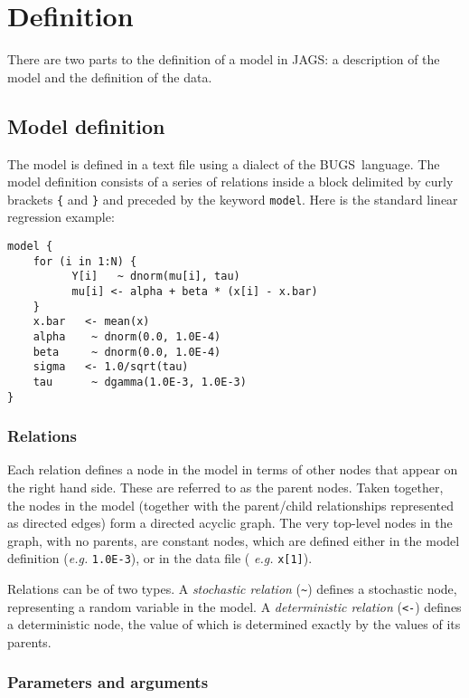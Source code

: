\documentclass[11pt, a4paper, titlepage]{report}
\newcommand{\JAGS}{\textsf{JAGS}}
\newcommand{\BUGS}{\textsf{BUGS}}
\begin{document}
\section{Definition}

There are two parts to the definition of a model in \JAGS: a
description of the model and the definition of the data.

\subsection{Model definition}

The model is defined in a text file using a dialect of the
\BUGS\ language.  The model definition consists of a series of
relations inside a block delimited by curly brackets \verb+{+ and
\verb+}+ and preceded by the keyword \verb+model+. Here is the standard
linear regression example:

\begin{verbatim}
model {
    for (i in 1:N) {
          Y[i]   ~ dnorm(mu[i], tau)
          mu[i] <- alpha + beta * (x[i] - x.bar)
    }
    x.bar   <- mean(x)
    alpha    ~ dnorm(0.0, 1.0E-4)
    beta     ~ dnorm(0.0, 1.0E-4)
    sigma   <- 1.0/sqrt(tau)
    tau      ~ dgamma(1.0E-3, 1.0E-3)
}
\end{verbatim}

\subsubsection{Relations}

Each relation defines a node in the model in terms of other nodes that
appear on the right hand side. These are referred to as the parent
nodes. Taken together, the nodes in the model (together with the
parent/child relationships represented as directed edges) form a
directed acyclic graph. The very top-level nodes in the graph, with no
parents, are constant nodes, which are defined either in the model
definition ({\em e.g.}  \verb+1.0E-3+), or in the data file ({\em
  e.g.}  \verb+x[1]+).

Relations can be of two types. A {\em stochastic relation} (\verb+~+)
defines a stochastic node, representing a random variable in the
model. A {\em deterministic relation} (\verb+<-+) defines a
deterministic node, the value of which is determined exactly by the
values of its parents.

\subsubsection{Parameters and arguments}
\end{document}
